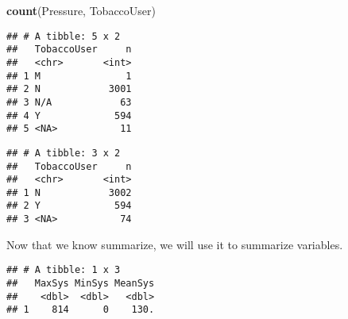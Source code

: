 \documentclass[
]{article}
\newenvironment{Shaded}{\begin{snugshade}}{\end{snugshade}}
\newcommand{\DataTypeTok}[1]{\textcolor[rgb]{0.13,0.29,0.53}{#1}}
\newcommand{\KeywordTok}[1]{\textcolor[rgb]{0.13,0.29,0.53}{\textbf{#1}}}
\newcommand{\NormalTok}[1]{#1}
\newcommand{\OperatorTok}[1]{\textcolor[rgb]{0.81,0.36,0.00}{\textbf{#1}}}
\newcommand{\OtherTok}[1]{\textcolor[rgb]{0.56,0.35,0.01}{#1}}
\newcommand{\StringTok}[1]{\textcolor[rgb]{0.31,0.60,0.02}{#1}}
\begin{document}
\begin{Shaded}
\begin{Highlighting}[]
\KeywordTok{count}\NormalTok{(Pressure, TobaccoUser)}
\end{Highlighting}
\end{Shaded}

\begin{verbatim}
## # A tibble: 5 x 2
##   TobaccoUser     n
##   <chr>       <int>
## 1 M               1
## 2 N            3001
## 3 N/A            63
## 4 Y             594
## 5 <NA>           11
\end{verbatim}

\begin{Shaded}
\end{Shaded}

\begin{verbatim}
## # A tibble: 3 x 2
##   TobaccoUser     n
##   <chr>       <int>
## 1 N            3002
## 2 Y             594
## 3 <NA>           74
\end{verbatim}

Now that we know summarize, we will use it to summarize variables.

\begin{Shaded}
\end{Shaded}

\begin{verbatim}
## # A tibble: 1 x 3
##   MaxSys MinSys MeanSys
##    <dbl>  <dbl>   <dbl>
## 1    814      0    130.
\end{verbatim}
\end{document}
